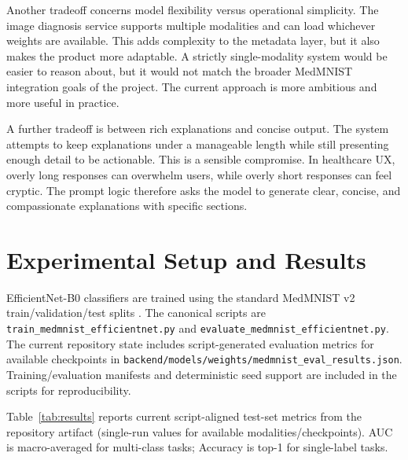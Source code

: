\documentclass[conference]{IEEEtran}
\begin{document}
Another tradeoff concerns model flexibility versus operational simplicity. The image diagnosis service supports multiple modalities and can load whichever weights are available. This adds complexity to the metadata layer, but it also makes the product more adaptable. A strictly single-modality system would be easier to reason about, but it would not match the broader MedMNIST integration goals of the project. The current approach is more ambitious and more useful in practice.

A further tradeoff is between rich explanations and concise output. The system attempts to keep explanations under a manageable length while still presenting enough detail to be actionable. This is a sensible compromise. In healthcare UX, overly long responses can overwhelm users, while overly short responses can feel cryptic. The prompt logic therefore asks the model to generate clear, concise, and compassionate explanations with specific sections.

\section{Experimental Setup and Results}
EfficientNet-B0 classifiers are trained using the standard MedMNIST v2 train/validation/test splits \cite{medmnistv2}. The canonical scripts are \texttt{train\_medmnist\_efficientnet.py} and \texttt{evaluate\_medmnist\_efficientnet.py}. The current repository state includes script-generated evaluation metrics for available checkpoints in \texttt{backend/models/weights/medmnist\_eval\_results.json}. Training/evaluation manifests and deterministic seed support are included in the scripts for reproducibility.

Table~\ref{tab:results} reports current script-aligned test-set metrics from the repository artifact (single-run values for available modalities/checkpoints). AUC is macro-averaged for multi-class tasks; Accuracy is top-1 for single-label tasks.
\end{document}
